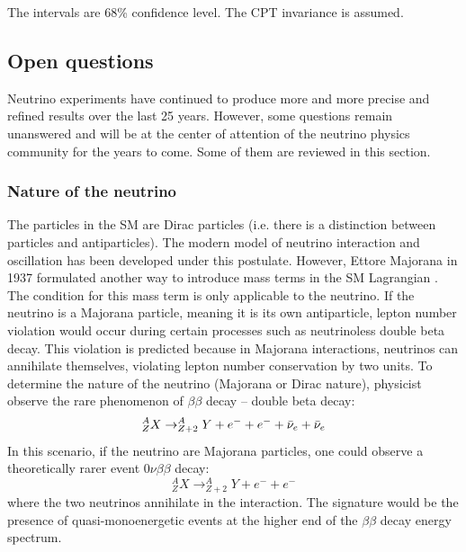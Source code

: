 The intervals are 68\% confidence level. The CPT invariance is assumed.

\subsection{Open questions}
\label{sec:neutrino:questions}

Neutrino experiments have continued to produce more and more precise and refined results over the last 25 years. However, some questions remain unanswered and will be at the center of attention of the neutrino physics community for the years to come. Some of them are reviewed in this section.

%
%
%
%
%

\subsubsection{Nature of the neutrino}

The particles in the SM are Dirac particles (i.e. there is a distinction between particles and antiparticles). The modern model of neutrino interaction and oscillation has been developed under this postulate. However, Ettore Majorana in 1937 formulated another way to introduce mass terms in the SM Lagrangian \cite{majorana_teoria_1937}. The condition for this mass term is only applicable to the neutrino. If the neutrino is a Majorana particle, meaning it is its own antiparticle, lepton number violation would occur during certain processes such as neutrinoless double beta decay. This violation is predicted because in Majorana interactions, neutrinos can annihilate themselves, violating lepton number conservation by two units. To determine the nature of the neutrino (Majorana or Dirac nature), physicist observe the rare phenomenon of $\beta\beta$ decay -- double beta decay:
\begin{equation}
  ^{A}_{Z}X \rightarrow ^{A}_{Z+2}Y + e^- + e^- + \bar{\nu}_{e} + \bar{\nu}_{e}
\end{equation}
In this scenario, if the neutrino are Majorana particles, one could observe a theoretically rarer event $0\nu\beta\beta$ decay:
\begin{equation}
  ^{A}_{Z}X \rightarrow ^{A}_{Z+2}Y + e^- + e^-
\end{equation}
where the two neutrinos annihilate in the interaction. The signature would be the presence of quasi-monoenergetic events at the higher end of the $\beta\beta$ decay energy spectrum.

